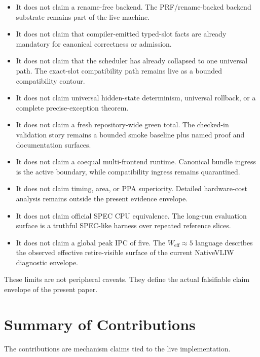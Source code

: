 \documentclass[twocolumn]{article}
\begin{document}
\begin{itemize}
\item It does not claim a rename-free backend. The PRF/rename-backed backend substrate remains part of the live machine.
\item It does not claim that compiler-emitted typed-slot facts are already mandatory for canonical correctness or admission.
\item It does not claim that the scheduler has already collapsed to one universal path. The exact-slot compatibility path remains live as a bounded compatibility contour.
\item It does not claim universal hidden-state determinism, universal rollback, or a complete precise-exception theorem.
\item It does not claim a fresh repository-wide green total. The checked-in validation story remains a bounded smoke baseline plus named proof and documentation surfaces.
\item It does not claim a coequal multi-frontend runtime. Canonical bundle ingress is the active boundary, while compatibility ingress remains quarantined.
\item It does not claim timing, area, or PPA superiority. Detailed hardware-cost analysis remains outside the present evidence envelope.
\item It does not claim official SPEC CPU equivalence. The long-run evaluation surface is a truthful SPEC-like harness over repeated reference slices.
\item It does not claim a global peak IPC of five. The \(W_{\mathrm{eff}}\approx5\) language describes the observed effective retire-visible surface of the current NativeVLIW diagnostic envelope.
\end{itemize}

These limits are not peripheral caveats. They define the actual falsifiable claim envelope of the present paper.


\section{Summary of Contributions}

The contributions are mechanism claims tied to the live implementation.
\end{document}
